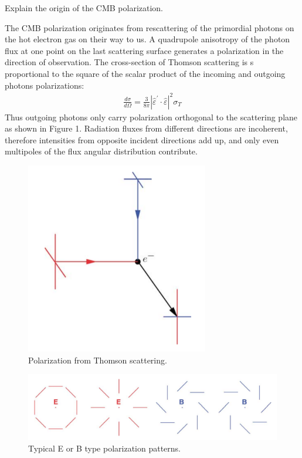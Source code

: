 \documentclass[answers]{exam}
\begin{document}
\begin{questions}
\question Explain the origin of the CMB polarization.
\begin{solution}
The CMB polarization originates from rescattering of the primordial photons on the hot electron gas on their way to us.
A quadrupole anisotropy of the photon flux at one point on the last scattering surface generates a polarization in the direction of observation.  
The cross-section of Thomson scattering is s proportional to the square of the scalar product of the incoming and outgoing photons polarizations:
\begin{align*}
\frac{d \sigma}{d \Omega}=\frac{3}{8 \pi}\left|\hat{\varepsilon}^{\prime} \cdot \hat{\varepsilon}\right|^{2} \sigma_{T}   
\end{align*}
Thus outgoing photons only carry polarization orthogonal to the scattering
plane as shown in Figure 1. Radiation fluxes from different directions are incoherent, therefore intensities from opposite incident directions add up,
and only even multipoles of the flux angular distribution contribute. 
\end{solution}
\begin{figure}[h]
\centering
\includegraphics[width=8cm]{Figure/7.png}
\caption{ Polarization from Thomson scattering.}
\end{figure}

\begin{figure}[h]
\centering
\includegraphics[width=13cm]{Figure/8.png}
\caption{  Typical E or B type polarization patterns.}
\end{figure}






\end{questions}
\end{document}

